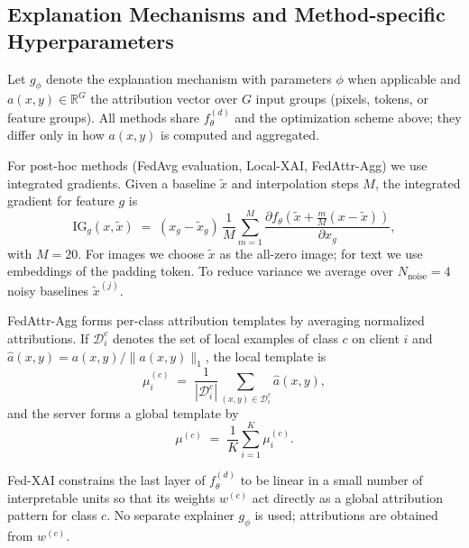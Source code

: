 \documentclass{article}
\theoremstyle{plain}
\theoremstyle{definition}
\theoremstyle{remark}
\begin{document}
\subsection{Explanation Mechanisms and Method-specific Hyperparameters}

Let $g_{\phi}$ denote the explanation mechanism with parameters $\phi$ when applicable and $a(x,y)\in\mathbb{R}^{G}$ the attribution vector over $G$ input groups (pixels, tokens, or feature groups). All methods share $f_{\theta}^{(d)}$ and the optimization scheme above; they differ only in how $a(x,y)$ is computed and aggregated.

For post-hoc methods (FedAvg evaluation, Local-XAI, FedAttr-Agg) we use integrated gradients. Given a baseline $\tilde{x}$ and interpolation steps $M$, the integrated gradient for feature $g$ is
\[
\mathrm{IG}_g(x,\tilde{x}) \;=\; (x_g - \tilde{x}_g)\,
\frac{1}{M}\sum_{m=1}^{M} 
\frac{\partial f_{\theta}( \tilde{x} + \tfrac{m}{M} (x-\tilde{x}) )}{\partial x_g},
\]
with $M{=}20$. For images we choose $\tilde{x}$ as the all-zero image; for text we use embeddings of the padding token. To reduce variance we average over $N_{\text{noise}}{=}4$ noisy baselines $\tilde{x}^{(j)}$.

FedAttr-Agg forms per-class attribution templates by averaging normalized attributions. If $\mathcal{D}_i^c$ denotes the set of local examples of class $c$ on client $i$ and $\hat{a}(x,y) = a(x,y)/\|a(x,y)\|_1$, the local template is
\[
\mu_{i}^{(c)} \;=\; \frac{1}{|\mathcal{D}_i^c|} \sum_{(x,y)\in \mathcal{D}_i^c} \hat{a}(x,y), 
\]
and the server forms a global template by
\[
\mu^{(c)} \;=\; \frac{1}{K}\sum_{i=1}^{K} \mu_{i}^{(c)}.
\]

Fed-XAI constrains the last layer of $f_{\theta}^{(d)}$ to be linear in a small number of interpretable units so that its weights $w^{(c)}$ act directly as a global attribution pattern for class $c$. No separate explainer $g_{\phi}$ is used; attributions are obtained from $w^{(c)}$.
\end{document}
